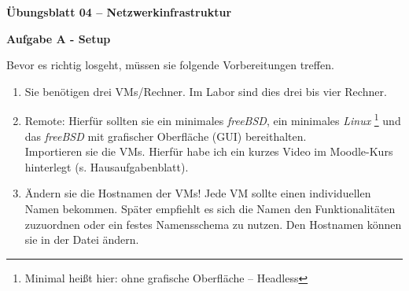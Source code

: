 \documentclass[paper=a4,fontsize=11pt]{scrartcl}%
\begin{document}
\begin{center}
\Large{\textbf{Übungsblatt 04 -- Netzwerkinfrastruktur}}\\
\end{center}

\begin{center}\Large{\textbf{Aufgabe A - Setup}}\end{center}
Bevor es richtig losgeht, müssen sie folgende Vorbereitungen treffen.
\begin{enumerate}
	\item Sie benötigen drei VMs/Rechner. Im Labor sind dies drei bis vier Rechner.
	\item Remote: Hierfür sollten sie ein minimales \emph{freeBSD}, ein minimales \emph{Linux} \footnote{Minimal heißt hier: ohne grafische Oberfläche -- Headless} und das \emph{freeBSD} mit grafischer Oberfläche (GUI) bereithalten. \\
Importieren sie die VMs. Hierfür habe ich ein kurzes Video im Moodle-Kurs hinterlegt (s. Hausaufgabenblatt).
	\item Ändern sie die Hostnamen der VMs! Jede VM sollte einen individuellen Namen bekommen. Später empfiehlt es sich die Namen den Funktionalitäten zuzuordnen oder ein festes Namensschema zu nutzen. Den Hostnamen können sie in der Datei  ändern.
\end{enumerate}
	
\end{document}
